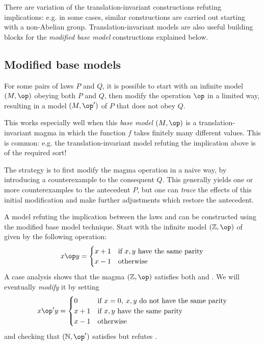 There are variation of the translation-invariant constructions refuting implications: e.g. in some cases,
similar constructions are carried out starting with a non-Abelian group. Translation-invariant models
are also useful building blocks for the \emph{modified base model} constructions explained below.

\subsection{Modified base models}

For some pairs of laws $P$ and $Q$, it is possible to start with an infinite model $(M,\op)$ obeying both $P$ and $Q$,
then modify the operation $\op$ in a limited way, resulting in a model $(M,\op')$ of $P$ that does not obey $Q$.

This works especially well when this \emph{base model} $(M,\op)$ is a translation-invariant magma in which
the function $f$ takes finitely many different values. This is common: e.g. the translation-invariant model
refuting the implication above is of the required sort!

The strategy is to first modify the magma operation in a naive way, by introducing a counterexample to the
consequent $Q$. This generally yields one or more counterexamples to the antecedent $P$, but one can
\emph{trace} the effects of this initial modification and make further adjustments which restore the
antecedent.

A model refuting the implication between the laws  and  can be constructed using
the modified base model technique. Start with the infinite model $(\mathbb{Z},\op)$ of  given by the following operation:
$$ x\op y = \begin{cases} x+1 & \text{if } x,y \text{ have the same parity} \\ x -1 & \text{otherwise} \end{cases} $$
A case analysis shows that the magma $(\mathbb{Z},\op)$  satisfies both  and .
We will eventually \emph{modify} it by setting
$$x \op' y = \begin{cases} 0 & \text{if } x=0,\: x,y \text{ do not have the same parity} \\  x+1 & \text{if } x,y \text{ have the same parity} \\ x -1 & \text{otherwise} \end{cases}$$
and checking that $(\mathbb{N}, \op' )$ satisfies  but refutes .

